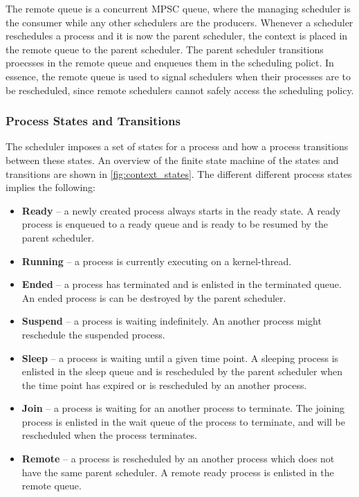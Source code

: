 The remote queue is a concurrent MPSC queue, where the managing scheduler is the consumer while any other schedulers are the producers. Whenever a scheduler reschedules a process and it is now the parent scheduler, the context is placed in the remote queue to the parent scheduler. The parent scheduler transitions proecsses in the remote queue and enqueues them in the scheduling polict. In essence, the remote queue is used to signal schedulers when their processes are to be rescheduled, since remote schedulers cannot safely access the scheduling policy.


\subsubsection{Process States and Transitions}


The scheduler imposes a set of states for a process and how a process transitions between these states. An overview of the finite state machine of the states and transitions are shown in \cref{fig:context_states}. The different different process states implies the following:

\begin{itemize}[topsep=0em,itemsep=-1em,partopsep=0.5em,parsep=1em]
    \item \textbf{Ready} -- a newly created process always starts in the ready state. A ready process is enqueued to a ready queue and is ready to be resumed by the parent scheduler.
    \item \textbf{Running} -- a process is currently executing on a kernel\hyp{}thread.
    \item \textbf{Ended} -- a process has terminated and is enlisted in the terminated queue. An ended process is can be destroyed by the parent scheduler.
    \item \textbf{Suspend} -- a process is waiting indefinitely. An another process might reschedule the suspended process.
    \item \textbf{Sleep} -- a process is waiting until a given time point. A sleeping process is enlisted in the sleep queue and is rescheduled by the parent scheduler when the time point has expired or is rescheduled by an another process.
    \item \textbf{Join} -- a process is waiting for an another process to terminate. The joining process is enlisted in the wait queue of the process to terminate, and will be rescheduled when the process terminates.
    \item \textbf{Remote} -- a process is rescheduled by an another process which does not have the same parent scheduler. A remote ready process is enlisted in the remote queue.
\end{itemize}

